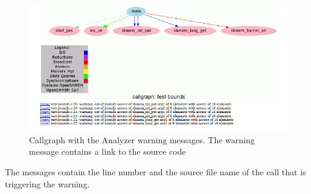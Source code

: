 \vspace{0.1in}

\begin{figure}[!ht]
  \begin{center}
    \includegraphics[width=1.0\textwidth]{./callgraph_test_bounds}
    \caption{Callgraph with the \openshmem Analyzer warning messages.
      The warning message contains a link to the source code}
    \label{fig:warnings}
  \end{center}
\end{figure}

The messages contain the line number and the source file name of the
\openshmem call that is triggering the warning.


